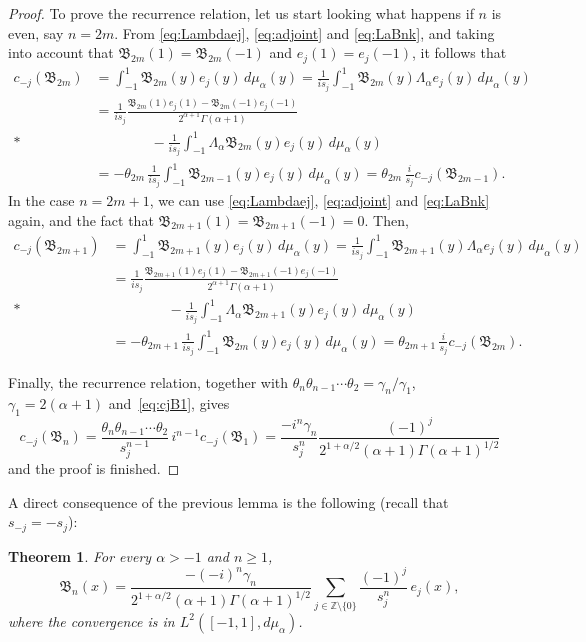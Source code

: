 \documentclass[10pt,a4paper]{article}
\theoremstyle{plain}
\newtheorem{theorem}{Theorem}[section]
\theoremstyle{definition}
\numberwithin{equation}{section} %
\newcommand{\La}{\Lambda_{\alpha}}
\newcommand{\mua}{\mu_{\alpha}}
\newcommand{\B}{\mathfrak{B}}
\newcommand{\ZZO}{\mathbb{Z} \setminus \{0\}}
\newcommand{\cc}{\gamma}
\begin{document}
\begin{proof}
To prove the recurrence relation,
let us start looking what happens if $n$ is even, say $n=2m$.
From \eqref{eq:Lambdaej}, \eqref{eq:adjoint} and \eqref{eq:LaBnk},
and taking into account that $\B_{2m}(1) = \B_{2m}(-1)$ and $e_{j}(1) = e_{j}(-1)$, it follows that
\begin{align*}
  c_{-j}(\B_{2m}) &= \int_{-1}^{1} \B_{2m}(y) e_{j}(y)\, d\mua(y)
  = \frac{1}{is_j} \int_{-1}^{1} \B_{2m}(y) \La e_{j}(y)\, d\mua(y)
  \\
  &= \frac{1}{is_j}
    \frac{\B_{2m}(1) e_{j}(1) - \B_{2m}(-1) e_{j}(-1)}
    {2^{\alpha+1}\Gamma(\alpha+1)}
  \\*
  &\qquad\qquad
  - \frac{1}{is_j} \int_{-1}^{1} \La \B_{2m}(y) e_{j}(y)\, d\mua(y)
  \\
  &= - \theta_{2m}\,\frac{1}{is_j} \int_{-1}^{1} \B_{2m-1}(y) e_{j}(y)\, d\mua(y)
  = \theta_{2m}\,\frac{i}{s_j} c_{-j}(\B_{2m-1}).
\end{align*}
In the case $n=2m+1$, we can use \eqref{eq:Lambdaej}, \eqref{eq:adjoint} and \eqref{eq:LaBnk} again, and the fact that $\B_{2m+1}(1) = \B_{2m+1}(-1) = 0$. Then,
\begin{align*}
  c_{-j}(\B_{2m+1}) &= \int_{-1}^{1} \B_{2m+1}(y) e_{j}(y)\, d\mua(y)
  = \frac{1}{is_j} \int_{-1}^{1} \B_{2m+1}(y) \La e_{j}(y)\, d\mua(y)
  \\
  &= \frac{1}{is_j}
    \frac{\B_{2m+1}(1) e_{j}(1) - \B_{2m+1}(-1) e_{j}(-1)}
    {2^{\alpha+1}\Gamma(\alpha+1)}
  \\*
  &\qquad\qquad - \frac{1}{is_j} \int_{-1}^{1} \La \B_{2m+1}(y) e_{j}(y)\, d\mua(y)
  \\
  &= - \theta_{2m+1}\,\frac{1}{is_j} \int_{-1}^{1} \B_{2m}(y) e_{j}(y)\, d\mua(y)
  = \theta_{2m+1}\,\frac{i}{s_j} c_{-j}(\B_{2m}).
\end{align*}

Finally, the recurrence relation, together with $\theta_n\theta_{n-1} \cdots \theta_2 = \cc_n/\cc_1$, $\cc_1=2(\alpha+1)$ and~\eqref{eq:cjB1}, gives
\[
  c_{-j}(\B_n) = \frac{\theta_n\theta_{n-1}\cdots \theta_2}{s_j^{n-1}} \, i^{n-1} c_{-j}(\B_1)
  = \frac{-i^n \cc_n}{s_j^n} \frac{(-1)^j}{2^{1+\alpha/2}(\alpha+1)\Gamma(\alpha+1)^{1/2}}
\]
and the proof is finished.
\end{proof}

A direct consequence of the previous lemma is the following (recall that $s_{-j} = -s_j$):

\begin{theorem}
\label{thm:sfbd}
For every $\alpha>-1$ and $n\ge 1$,
\begin{equation}
\label{eq:sfbd}
  \B_n(x) = \frac{-(-i)^n\cc_n}{2^{1+\alpha/2}(\alpha+1)\Gamma(\alpha+1)^{1/2}}
  \sum_{j\in \ZZO} \frac{(-1)^j}{s_j^n} \, e_j(x),
\end{equation}
where the convergence is in $L^2([-1,1],d\mua)$.
\end{theorem}
\end{document}
